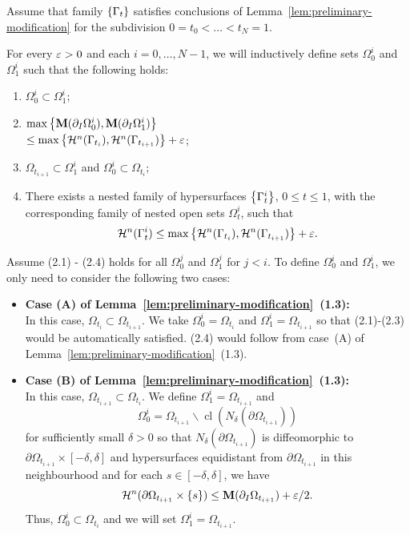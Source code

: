 Assume that family $\left\{\Gamma_t\right\}$ satisfies conclusions of Lemma~\ref{lem:preliminary-modification} for the subdivision $0 = t_0 < \dots < t_N = 1$.

For every $\varepsilon > 0$ and each $i = 0, \dots, N - 1$, we will inductively define sets $\Omega_0^i$ and $\Omega_1^i$ such that the following holds:
\begin{enumerate}
    \item[(2.1)] $\Omega_0^i \subset \Omega_1^i$;
    \item[(2.2)] $\max\left\{\mathbf{M}(\partial_I\Omega_0^i), \mathbf{M}(\partial_I\Omega_1^i)\right\}$ \\
    $\leq \max\left\{\mathcal{H}^n(\Gamma_{t_i}), \mathcal{H}^n(\Gamma_{t_{i + 1}})\right\} + \varepsilon$;
    \item[(2.3)] $\Omega_{t_{i + 1}} \subset \Omega_1^i$ and $\Omega_0^i \subset \Omega_{t_i}$;
    \item[(2.4)] There exists a nested family of hypersurfaces $\left\{\Gamma_t^i\right\}$, $0 \leq t \leq 1$, with the corresponding family of nested open sets $\Omega_t^i$, such that
    \begin{equation*}
        \mathcal{H}^n(\Gamma_t^i) \leq \max\left\{\mathcal{H}^n(\Gamma_{t_i}), \mathcal{H}^n(\Gamma_{t_{i+1}})\right\} + \varepsilon.
    \end{equation*}
\end{enumerate}
Assume (2.1) - (2.4) holds for all $\Omega_0^j$ and $\Omega_1^j$ for $j < i$. To define $\Omega_0^i$ and $\Omega_1^i$, we only need to consider the following two cases:
\begin{itemize}
    \item \textbf{Case (A) of Lemma~\ref{lem:preliminary-modification}~(1.3):}\\
    In this case, $\Omega_{t_i} \subset \Omega_{t_{i + 1}}$. We take $\Omega_0^i = \Omega_{t_i}$ and $\Omega_1^i = \Omega_{t_{i + 1}}$ so that (2.1)-(2.3) would be automatically satisfied. (2.4) would follow from case~(A) of Lemma~\ref{lem:preliminary-modification}~(1.3).
    \item \textbf{Case (B) of Lemma~\ref{lem:preliminary-modification}~(1.3):}\\
    In this case, $\Omega_{t_{i + 1}} \subset \Omega_{t_i}$. We define $\Omega_1^i = \Omega_{t_{i + 1}}$ and
    \begin{equation*}
        \Omega_0^i = \Omega_{t_{i + 1}}\backslash \operatorname{cl}(N_\delta(\partial\Omega_{t_{i + 1}}))
    \end{equation*}
    for sufficiently small $\delta > 0$ so that $N_\delta(\partial\Omega_{t_{i + 1}})$ is diffeomorphic to $\partial\Omega_{t_{i + 1}} \times [-\delta, \delta]$ and hypersurfaces equidistant from $\partial\Omega_{t_{i + 1}}$ in this neighbourhood and for each $s \in [-\delta, \delta]$, we have
    \begin{equation*}
        \mathcal{H}^n(\partial\Omega_{t_{i + 1}}\times \left\{s\right\}) \leq \mathbf{M}(\partial_I\Omega_{t_{i + 1}}) + \varepsilon/2.
    \end{equation*}
    Thus, $\Omega_0^i \subset \Omega_{t_i}$ and we will set $\Omega_1^i = \Omega_{t_{i + 1}}$.
\end{itemize}
